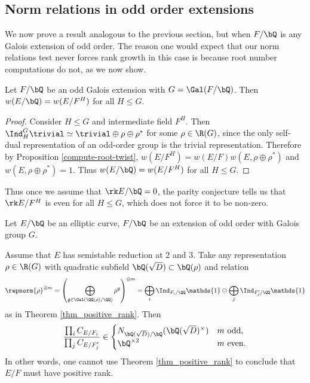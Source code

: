 \subsection{Norm relations in odd order extensions}

We now prove a result analogous to the previous section, but when $F / \bQ$ is any Galois extension of odd order. The reason one would expect that our norm relations test never forces rank growth in this case is because root number computations do not, as we now show.

\begin{lemma}
 Let $F / \bQ$ be an odd Galois extension with $G = \Gal(F / \bQ)$. Then $w(E / \bQ) = w(E / F^H)$ for all $H \leq G$. 
\end{lemma}

\begin{proof}
Consider $H \leq G$ and intermediate field $F^H$. Then 
$\Ind_H^G \trivial \simeq \trivial \oplus 
\rho \oplus \rho^*$ for some $\rho \in \R(G)$, since the only self-dual representation of an odd-order group is the trivial representation. Therefore by Proposition \ref{compute-root-twist}, $w(E / F^H) = w(E / F)w(E, \rho \oplus \rho^*)$ and $w(E, \rho \oplus \rho^*) = 1$. Thus $w(E / \bQ) = w(E / F^H)$ for all $H \leq G$. 
\end{proof}

Thus once we assume that $\rk E / \bQ = 0$, the parity conjecture tells us that $\rk E / F^H$ is even for all $H \leq G$, which does not force it to be non-zero. 


\begin{thm}\label{odd-exts}
 Let $E / \bQ$ be an elliptic curve, $F / \bQ$ be an extension of odd order with Galois group $G$. 
 
Assume that $E$ has semistable reduction at $2$ and $3$. 
Take any representation $\rho \in \R(G)$ with quadratic subfield $\bQ(\sqrt{D}) \subset \bQ(\rho)$ and relation
\begin{equation*}\label{odd-exp} \repnorm{\rho}^{\oplus m} =
 \left(\bigoplus_{\mathfrak{g}\in\Gal(\QQ(\rho)/\QQ)}\rho^{\mathfrak{g}}\right)^{\oplus m }=\bigoplus_i\Ind_{F_i/\QQ}\mathds{1}\ominus\bigoplus_j\Ind_{F'_j/\QQ}\mathds{1}
\end{equation*}
 as in Theorem \ref{thm_positive_rank}. Then
 \[ \frac{\prod_i C_{E/F_i}}{\prod_j C_{E/F_j'}}  \in 
    \begin{cases}
        N_{\bQ(\sqrt{D}) / \bQ}(\bQ(\sqrt{D})^{\times}) & m \ \text{odd}, \\
        \bQ^{\times 2} & m \ \text{even}.
    \end{cases} \] 
    In other words, one cannot use Theorem \ref{thm_positive_rank} to conclude that $E / F$ must have positive rank. 
\end{thm}

